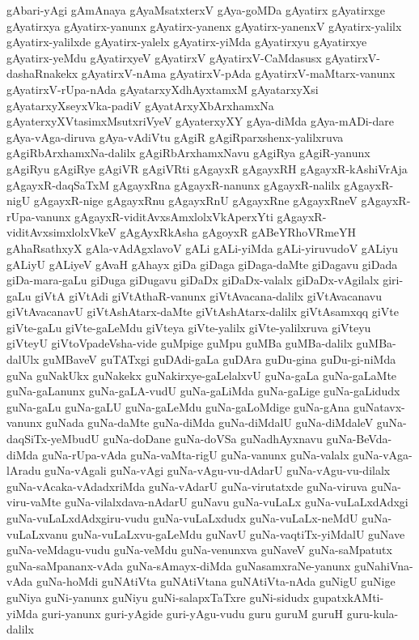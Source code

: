 {gAbari-yAgi
gAmAnaya
gAyaMsatxterxV
gAya-goMDa
gAyatirx
gAyatirxge
gAyatirxya
gAyatirx-yanunx
gAyatirx-yanenx
gAyatirx-yanenxV
gAyatirx-yalilx
gAyatirx-yalilxde
gAyatirx-yalelx
gAyatirx-yiMda
gAyatirxyu
gAyatirxye
gAyatirx-yeMdu
gAyatirxyeV
gAyatirxV
gAyatirxV-CaMdasusx
gAyatirxV-dashaRnakekx
gAyatirxV-nAma
gAyatirxV-pAda
gAyatirxV-maMtarx-vanunx
gAyatirxV-rUpa-nAda
gAyatarxyXdhAyxtamxM
gAyatarxyXsi
gAyatarxyXseyxVka-padiV
gAyatArxyXbArxhamxNa
gAyaterxyXVtasimxMsutxriVyeV
gAyaterxyXY
gAya-diMda
gAya-mADi-dare
gAya-vAga-diruva
gAya-vAdiVtu
gAgiR
gAgiRparxshenx-yalilxruva
gAgiRbArxhamxNa-dalilx
gAgiRbArxhamxNavu
gAgiRya
gAgiR-yanunx
gAgiRyu
gAgiRye
gAgiVR
gAgiVRti
gAgayxR
gAgayxRH
gAgayxR-kAshiVrAja
gAgayxR-daqSaTxM
gAgayxRna
gAgayxR-nanunx
gAgayxR-nalilx
gAgayxR-nigU
gAgayxR-nige
gAgayxRnu
gAgayxRnU
gAgayxRne
gAgayxRneV
gAgayxR-rUpa-vanunx
gAgayxR-viditAvxsAmxlolxVkAperxYti
gAgayxR-viditAvxsimxlolxVkeV
gAgAyxRkAsha
gAgoyxR
gABeYRhoVRmeYH
gAhaRsathxyX
gAla-vAdAgxlavoV
gALi
gALi-yiMda
gALi-yiruvudoV
gALiyu
gALiyU
gALiyeV
gAvaH
gAhayx
giDa
giDaga
giDaga-daMte
giDagavu
giDada
giDa-mara-gaLu
giDuga
giDugavu
giDaDx
giDaDx-valalx
giDaDx-vAgilalx
giri-gaLu
giVtA
giVtAdi
giVtAthaR-vanunx
giVtAvacana-dalilx
giVtAvacanavu
giVtAvacanavU
giVtAshAtarx-daMte
giVtAshAtarx-dalilx
giVtAsamxqq
giVte
giVte-gaLu
giVte-gaLeMdu
giVteya
giVte-yalilx
giVte-yalilxruva
giVteyu
giVteyU
giVtoVpadeVsha-vide
guMpige
guMpu
guMBa
guMBa-dalilx
guMBa-dalUlx
guMBaveV
guTATxgi
guDAdi-gaLa
guDAra
guDu-gina
guDu-gi-niMda
guNa
guNakUkx
guNakekx
guNakirxye-gaLelalxvU
guNa-gaLa
guNa-gaLaMte
guNa-gaLanunx
guNa-gaLA-vudU
guNa-gaLiMda
guNa-gaLige
guNa-gaLidudx
guNa-gaLu
guNa-gaLU
guNa-gaLeMdu
guNa-gaLoMdige
guNa-gAna
guNatavx-vanunx
guNada
guNa-daMte
guNa-diMda
guNa-diMdalU
guNa-diMdaleV
guNa-daqSiTx-yeMbudU
guNa-doDane
guNa-doVSa
guNadhAyxnavu
guNa-BeVda-diMda
guNa-rUpa-vAda
guNa-vaMta-rigU
guNa-vanunx
guNa-valalx
guNa-vAga-lAradu
guNa-vAgali
guNa-vAgi
guNa-vAgu-vu-dAdarU
guNa-vAgu-vu-dilalx
guNa-vAcaka-vAdadxriMda
guNa-vAdarU
guNa-virutatxde
guNa-viruva
guNa-viru-vaMte
guNa-vilalxdava-nAdarU
guNavu
guNa-vuLaLx
guNa-vuLaLxdAdxgi
guNa-vuLaLxdAdxgiru-vudu
guNa-vuLaLxdudx
guNa-vuLaLx-neMdU
guNa-vuLaLxvanu
guNa-vuLaLxvu-gaLeMdu
guNavU
guNa-vaqtiTx-yiMdalU
guNave
guNa-veMdagu-vudu
guNa-veMdu
guNa-venunxva
guNaveV
guNa-saMpatutx
guNa-saMpananx-vAda
guNa-sAmayx-diMda
guNasamxraNe-yanunx
guNahiVna-vAda
guNa-hoMdi
guNAtiVta
guNAtiVtana
guNAtiVta-nAda
guNigU
guNige
guNiya
guNi-yanunx
guNiyu
guNi-salapxTaTxre
guNi-sidudx
gupatxkAMti-yiMda
guri-yanunx
guri-yAgide
guri-yAgu-vudu
guru
guruM
guruH
guru-kula-dalilx
}
